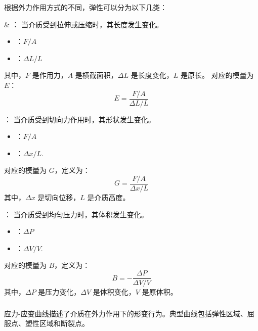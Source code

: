 根据外力作用方式的不同，弹性可以分为以下几类：
\begin{Itemize}
    \item {} \& ：
    当介质受到拉伸或压缩时，其长度发生变化。
    \begin{itemize}
        \item {}：\(F/A\)
        \item {}：\(\Delta L / L\)
    \end{itemize}
    其中，\(F\) 是作用力，\(A\) 是横截面积，\(\Delta L\) 是长度变化，\(L\) 是原长。
    对应的模量为  \(E\)：
    \[
        E = \frac{F/A}{\Delta L / L}
    \]
    \item {}：
    当介质受到切向力作用时，其形状发生变化。
    \begin{itemize}
        \item {}：\(F/A\)
        \item {}：\(\Delta x / L\).
    \end{itemize}
    对应的模量为 \(G\)，定义为：
    \[
        G = \frac{F/A}{\Delta x / L}
    \]
    其中，\(\Delta x\) 是切向位移，\(L\) 是介质高度。
    \item {}：
    当介质受到均匀压力时，其体积发生变化。
    \begin{itemize}
        \item {}：\(\Delta P\)
        \item {}：\(\Delta V / V\).
    \end{itemize}
    对应的模量为  \(B\)，定义为：
    \[
        B = -\frac{\Delta P}{\Delta V / V}
    \]
    其中，\(\Delta P\) 是压力变化，\(\Delta V\) 是体积变化，\(V\) 是原体积。
\end{Itemize}

\subsubsection[应力-应变曲线]{}
应力-应变曲线描述了介质在外力作用下的形变行为。典型曲线包括弹性区域、屈服点、塑性区域和断裂点。

